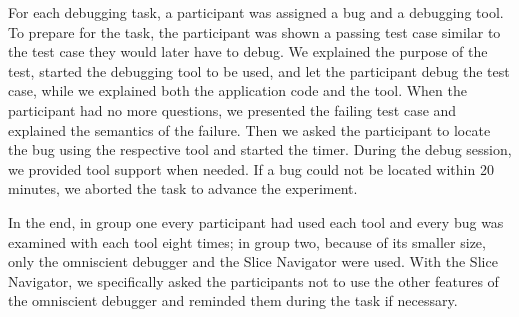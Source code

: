 \documentclass[
			english,
			review,
			]{elsarticle}
\begin{document}
For each debugging task, a participant was assigned a bug and a debugging tool.
To prepare for the task, the participant was shown a passing test case similar to the test case they would later have to debug.
We explained the purpose of the test, started the debugging tool to be used,
and let the participant debug the test case, while we explained both the application code and the tool.
When the participant had no more questions, we presented the failing test case and explained the semantics of the failure.
Then we asked the participant to locate the bug using the respective tool and started the timer.
During the debug session, we provided tool support when needed.
If a bug could not be located within 20 minutes, we aborted the task to advance the experiment.

In the end, in group one every participant had used each tool and every bug was examined with each tool eight times; in group two, because of its smaller size, only the omniscient debugger and the Slice Navigator were used.
With the Slice Navigator, we specifically asked the participants not to use the other features of the omniscient debugger and reminded them during the task if necessary.


\end{document}
